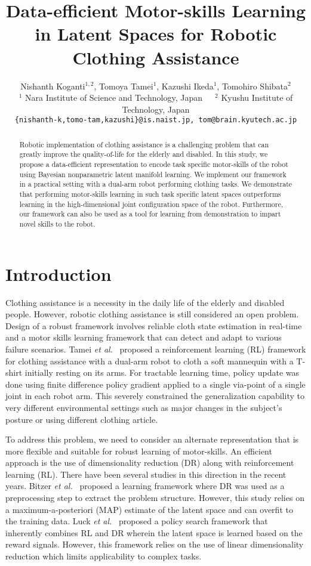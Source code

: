 \documentclass{article}
\title{Data-efficient Motor-skills Learning in Latent Spaces for Robotic Clothing Assistance}
\author{
  Nishanth Koganti$^{1,2}$, Tomoya Tamei$^{1}$, Kazushi Ikeda$^{1}$, Tomohiro Shibata$^{2}$\\
  $^1$ Nara Institute of Science and Technology, Japan~~~$^2$ Kyushu Institute of Technology, Japan\\
  \texttt{\{nishanth-k,tomo-tam,kazushi\}@is.naist.jp, tom@brain.kyutech.ac.jp} \\
}
\begin{document}
\maketitle

\begin{abstract}
Robotic implementation of clothing assistance is a challenging problem that can greatly improve the quality-of-life for the elderly and disabled. In this study, we propose a data-efficient representation to encode task specific motor-skills of the robot using Bayesian nonparametric latent manifold learning. We implement our framework in a practical setting with a dual-arm robot performing clothing tasks. We demonstrate that performing motor-skills learning in such task specific latent spaces outperforms learning in the high-dimensional joint configuration space of the robot. Furthermore, our framework can also be used as a tool for learning from demonstration to impart novel skills to the robot.
\end{abstract}

\section{Introduction}
\label{section:introduction}

Clothing assistance is a necessity in the daily life of the elderly and disabled people. However, robotic clothing assistance is still considered an open problem. Design of a robust framework involves reliable cloth state estimation in real-time and a motor skills learning framework that can detect and adapt to various failure scenarios. Tamei \emph{et al.}~\cite{tamei} proposed a reinforcement learning (RL) framework for clothing assistance with a dual-arm robot to cloth a soft mannequin with a T-shirt initially resting on its arms. For tractable learning time, policy update was done using finite difference policy gradient applied to a single via-point of a single joint in each robot arm. This severely constrained the generalization capability to very different environmental settings such as major changes in the subject's posture or using different clothing article.

To address this problem, we need to consider an alternate representation that is more flexible and suitable for robust learning of motor-skills. An efficient approach is the use of dimensionality reduction (DR) along with reinforcement learning (RL). There have been several studies in this direction in the recent years. Bitzer \emph{et al.}~\cite{bitzer} proposed a learning framework where DR was used as a preprocessing step to extract the problem structure. However, this study relies on a maximum-a-posteriori (MAP) estimate of the latent space and can overfit to the training data. Luck \emph{et al.}~\cite{luck} proposed a policy search framework that inherently combines RL and DR wherein the latent space is learned based on the reward signals. However, this framework relies on the use of linear dimensionality reduction which limits applicability to complex tasks.
\end{document}
